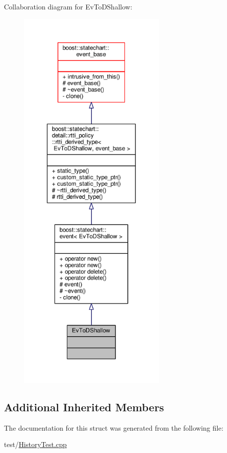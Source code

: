Collaboration diagram for Ev\+To\+D\+Shallow\+:
\nopagebreak
\begin{figure}[H]
\begin{center}
\leavevmode
\includegraphics[height=550pt]{struct_ev_to_d_shallow__coll__graph}
\end{center}
\end{figure}
\subsection*{Additional Inherited Members}


The documentation for this struct was generated from the following file\+:\begin{DoxyCompactItemize}
\item 
test/\mbox{\hyperlink{_history_test_8cpp}{History\+Test.\+cpp}}\end{DoxyCompactItemize}
